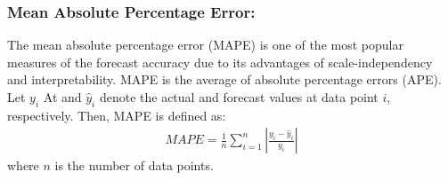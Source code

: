 \subsubsection{Mean Absolute Percentage Error:}
The mean absolute percentage error (MAPE) is one of the most popular measures of the forecast
 accuracy due to its advantages of scale-independency and interpretability.
MAPE is the average of absolute percentage errors (APE). Let $y_{i}$ At and $\hat{y}_{i}$ denote the actual and
forecast values at data point $i$, respectively. Then, MAPE is
defined as:
\begin{align*}
MAPE=\frac{1}{n}\sum_{i=1}^{n}\left|\frac{y_{i}-\hat{y}_{i}}{y_{i}}\right|
\end{align*}
where $n$ is the number of data points.